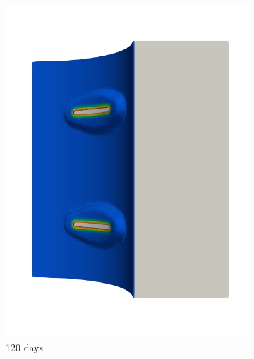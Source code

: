 \begin{figure}[!htb]
\begin{subfigure}[b]{0.2\textwidth}
    \includegraphics[width=\textwidth]{Chapter5/figures/spallation/seed_d_3}
    \caption{120 days}
  \end{subfigure}
  \begin{subfigure}[b]{0.2\textwidth}
    \centering

\end{subfigure}
\end{figure}
